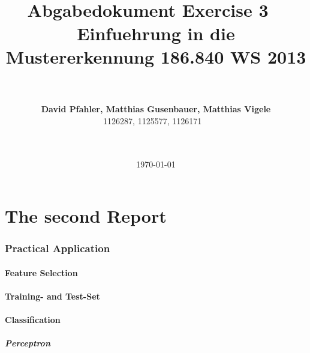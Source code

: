 \documentclass[subfigure,epsfig,fleqn,float,ausarbeitung]{scrartcl}
\begin{document}
\date{\today}

\title{~\\
  ~\\
  \fontsize{14}{14pt} \bf Abgabedokument Exercise 3
	 ~\\
  \fontsize{12}{12pt} \bf Einfuehrung in die Mustererkennung 186.840 WS 2013}

\author{~\\
  ~\\
  \fontsize{12}{12pt}
  {\bf David Pfahler, Matthias Gusenbauer, Matthias Vigele}\\
  1126287, 1125577, 1126171
  ~\\ ~\\ ~\\
  \normalsize
}

\maketitle
\normalfont
\thispagestyle{empty}


\part{The second Report}
\label{cha:secondReport}

\section{Practical Application}

\subsection{Feature Selection}

\subsection{Training- and Test-Set}

\subsection{Classification}

\subsubsection{Perceptron}
\end{document}
